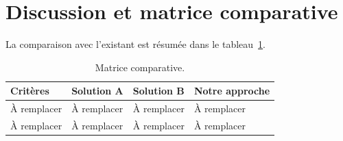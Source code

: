 \section{Discussion et matrice comparative}

La comparaison avec l'existant est résumée dans le tableau~\ref{tab:comparatif}.

\begin{table}[H]
	\centering
	\begin{tabular}{llll}
		\hline
		\textbf{Critères} & \textbf{Solution A} & \textbf{Solution B} & \textbf{Notre approche} \\
		\hline
		À remplacer & À remplacer & À remplacer & À remplacer \\
		À remplacer & À remplacer & À remplacer & À remplacer \\
		\hline
	\end{tabular}
	\caption{Matrice comparative.}
	\label{tab:comparatif}
\end{table}

